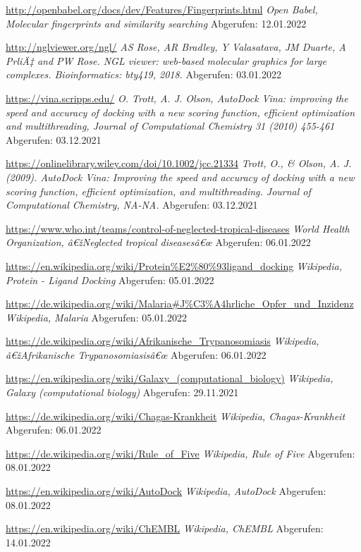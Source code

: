 \begin{thebibliography}{9}
\url{http://openbabel.org/docs/dev/Features/Fingerprints.html} \emph{Open Babel, Molecular fingerprints and similarity searching}
Abgerufen: 12.01.2022

\url{http://nglviewer.org/ngl/} \emph{AS Rose, AR Bradley, Y Valasatava, JM Duarte, A PrliÄ‡ and PW Rose. NGL viewer: web-based molecular graphics for large complexes. Bioinformatics: bty419, 2018.}
Abgerufen: 03.01.2022

\url{https://vina.scripps.edu/} \emph{O. Trott, A. J. Olson, AutoDock Vina: improving the speed and accuracy of docking with a new scoring function, efficient optimization and multithreading, Journal of Computational Chemistry 31 (2010) 455-461}
Abgerufen: 03.12.2021

\url{https://onlinelibrary.wiley.com/doi/10.1002/jcc.21334} \emph{Trott, O., & Olson, A. J. (2009). AutoDock Vina: Improving the speed and accuracy of docking with a new scoring function, efficient optimization, and multithreading. Journal of Computational Chemistry, NA-NA.}
Abgerufen: 03.12.2021

\url{https://www.who.int/teams/control-of-neglected-tropical-diseases} \emph{World Health Organization, â€žNeglected tropical diseasesâ€œ}
Abgerufen: 06.01.2022

\url{https://en.wikipedia.org/wiki/Protein%E2%80%93ligand_docking} \emph{Wikipedia, Protein - Ligand Docking}
Abgerufen: 05.01.2022

\url{https://de.wikipedia.org/wiki/Malaria#J%C3%A4hrliche_Opfer_und_Inzidenz} \emph{Wikipedia, Malaria}
Abgerufen: 05.01.2022

\url{https://de.wikipedia.org/wiki/Afrikanische_Trypanosomiasis} \emph{Wikipedia, â€žAfrikanische Trypanosomiasisâ€œ}
Abgerufen: 06.01.2022

\url{https://en.wikipedia.org/wiki/Galaxy_(computational_biology)} \emph{Wikipedia, Galaxy (computational biology)}
Abgerufen: 29.11.2021

\url{https://de.wikipedia.org/wiki/Chagas-Krankheit} \emph{Wikipedia, Chagas-Krankheit}
Abgerufen: 06.01.2022

\url{https://de.wikipedia.org/wiki/Rule_of_Five} \emph{Wikipedia, Rule of Five}
Abgerufen: 08.01.2022

\url{https://en.wikipedia.org/wiki/AutoDock} \emph{Wikipedia, AutoDock}
Abgerufen: 08.01.2022

\url{https://en.wikipedia.org/wiki/ChEMBL} \emph{Wikipedia, ChEMBL}
Abgerufen: 14.01.2022


\end{thebibliography}
